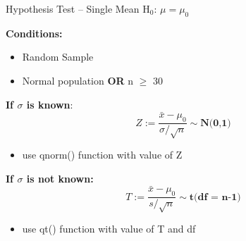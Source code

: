 \documentclass{beamer}
\begin{document}
\begin{frame}{Hypothesis Test -- Single Mean}
H$_0$: $\mu = \mu_0$ \vspace{3mm}

\textbf{Conditions:}
\begin{itemize}
    \item Random Sample
    \item Normal population \textbf{OR} n $\geq$ 30
\end{itemize} \vspace{3mm}

\textbf{If $\sigma$ is known}:
\begin{equation*}
    Z := \frac{\bar{x}-\mu_0}{\sigma / \sqrt{n}} \sim \textbf{N(0,1)}
\end{equation*} \vspace{-4mm}
\begin{itemize}
    \item use qnorm() function with value of Z
\end{itemize} \vspace{2mm}

\textbf{If $\sigma$ is not known:}
\begin{equation*}
    T := \frac{\bar{x}-\mu_0}{s / \sqrt{n}} \sim \textbf{t(df = n-1)}
\end{equation*} \vspace{-4mm}
\begin{itemize}
    \item use qt() function with value of T and df
\end{itemize}
\end{frame}
\end{document}
